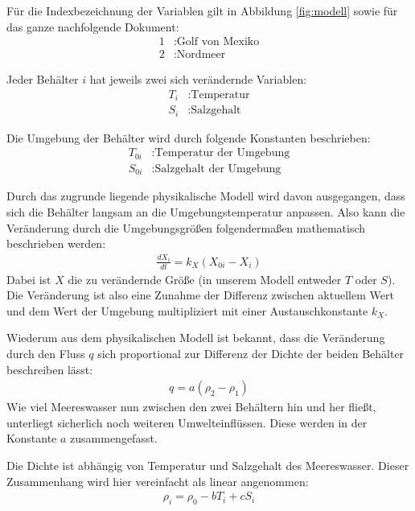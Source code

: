 \documentclass[a4paper,twoside]{article}
\begin{document}
	Für die Indexbezeichnung der Variablen gilt in Abbildung \ref{fig:modell} sowie für das ganze nachfolgende Dokument:
	\begin{align*}
		1 &: \textrm{Golf von Mexiko} \\
		2 &: \textrm{Nordmeer}
	\end{align*}

	Jeder Behälter \(i\) hat jeweils zwei sich verändernde Variablen:
	\begin{align*}
		T_i &: \textrm{Temperatur} \\
		S_i &: \textrm{Salzgehalt}
	\end{align*}
	
	Die Umgebung der Behälter wird durch folgende Konstanten beschrieben:
	\begin{align*}
		T_{0i} &: \textrm{Temperatur der Umgebung} \\
		S_{0i} &: \textrm{Salzgehalt der Umgebung}
	\end{align*}
	
	Durch das zugrunde liegende physikalische Modell \cite{Skript} wird davon ausgegangen, dass sich die Behälter langsam an die Umgebungstemperatur anpassen. Also kann die Veränderung durch die Umgebungsgrößen folgendermaßen mathematisch beschrieben werden:
	\begin{align*}
		\frac{dX_i}{dt} = k_X \left( X_{0i} - X_i \right)
	\end{align*}
	Dabei ist \(X\) die zu verändernde Größe (in unserem Modell entweder \(T\) oder \(S\)).
	Die Veränderung ist also eine Zunahme der Differenz zwischen aktuellem Wert und dem Wert der Umgebung multipliziert mit einer Austauschkonstante \(k_X\).
	
	Wiederum aus dem physikalischen Modell ist bekannt, dass die Veränderung durch den Fluss \(q\) sich proportional zur Differenz der Dichte der beiden Behälter beschreiben lässt:
	\begin{align*}
		q = a \left( \rho_2 - \rho_1 \right)
	\end{align*}
	Wie viel Meereswasser nun zwischen den zwei Behältern hin und her fließt, unterliegt sicherlich noch weiteren Umwelteinflüssen. Diese werden in der Konstante \(a\) zusammengefasst.
	
	Die Dichte ist abhängig von Temperatur und Salzgehalt des Meereswasser. Dieser Zusammenhang wird hier vereinfacht als linear angenommen:
	\begin{align*}
		\rho_i = \rho_0 - bT_i + cS_i
	\end{align*}
	
\end{document}
